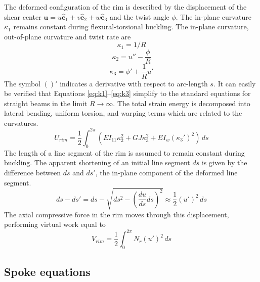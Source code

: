 \documentclass{bmd2016p}
\newcommand{\e}{\ensuremath{\hat{\bm{e}}_1}}
\newcommand{\ee}{\ensuremath{\hat{\bm{e}}_2}}
\newcommand{\eee}{\ensuremath{\hat{\bm{e}}_3}}
\begin{document}
The deformed configuration of the rim is described by the displacement of the shear center $\bm{u}=u\e + v\ee + w\eee$ and the twist angle $\phi$. The in-plane curvature $\kappa_1$ remains constant during flexural-torsional buckling. The in-plane curvature, out-of-plane curvature and twist rate are
	\begin{equation}\label{eq:k1}
	\kappa_1 = 1/R
	\end{equation}
	\begin{equation}\label{eq:k2}
	\kappa_2 = u'' - \frac{\phi}{R}
	\end{equation}
	\begin{equation}\label{eq:k3}
	\kappa_3 = \phi' + \frac{1}{R} u'
	\end{equation}
The symbol $()'$ indicates a derivative with respect to arc-length $s$. It can easily be verified that Equations \ref{eq:k1}--\ref{eq:k3} simplify to the standard equations for straight beams in the limit $R\rightarrow \infty$. The total strain energy is decomposed into lateral bending, uniform torsion, and warping terms which are related to the curvatures.
	\begin{equation}\label{eq:Urim}
	U_{rim} = \frac{1}{2} \int_0^{2\pi} \left( EI_{11} \kappa_2^2 + GJ \kappa_3^2 + EI_w (\kappa_3')^2 \right)\, ds
	\end{equation}
The length of a line segment of the rim is assumed to remain constant during buckling. The apparent shortening of an initial line segment $ds$ is given by the difference between $ds$ and $ds'$, the in-plane component of the deformed line segment.
	\begin{equation}\label{eq:ds}
	ds - ds' = ds - \sqrt{ds^2 - \left(\frac{du}{ds}ds\right)^2} \approx \frac{1}{2} (u')^2 \, ds
	\end{equation}
The axial compressive force in the rim moves through this displacement, performing virtual work equal to
	\begin{equation}\label{eq:Vrim}
	V_{rim} = \frac{1}{2} \int_0^{2\pi} N_r (u')^2 \, ds
	\end{equation}


\subsection{Spoke equations}
\end{document}
